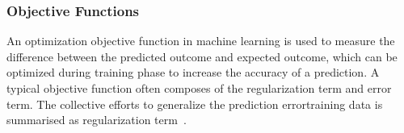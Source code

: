 \subsubsection{Objective Functions}
An optimization objective function in machine learning is used to measure the difference between the predicted outcome and expected outcome, which can be optimized during training phase to increase the accuracy of a prediction. A typical objective function often composes of the regularization term and error term. The collective efforts to generalize the prediction errortraining data is summarised as regularization term~\cite{goodfellow_2015}.  